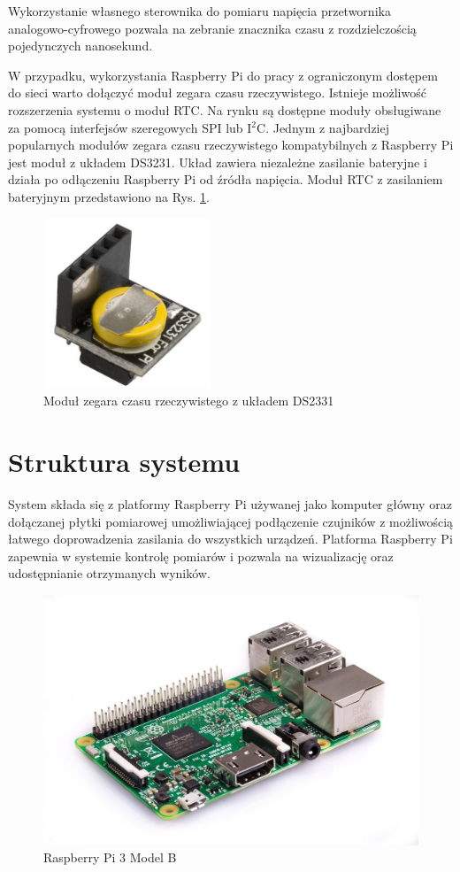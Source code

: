 Wykorzystanie własnego sterownika do pomiaru napięcia przetwornika analogowo-cyfrowego pozwala na zebranie znacznika czasu z rozdzielczością pojedynczych nanosekund. 

W przypadku, wykorzystania Raspberry Pi do pracy z ograniczonym dostępem do sieci warto dołączyć moduł zegara czasu rzeczywistego.
Istnieje możliwość rozszerzenia systemu o moduł RTC. Na rynku są dostępne moduły obsługiwane za pomocą interfejsów szeregowych SPI lub I$^2$C. Jednym z najbardziej popularnych modułów zegara czasu rzeczywistego kompatybilnych z Raspberry Pi jest moduł z układem DS3231\cite{rtc}. Układ zawiera niezależne zasilanie bateryjne i działa po odłączeniu Raspberry Pi od źródła napięcia.
Moduł RTC z zasilaniem bateryjnym przedstawiono na Rys. \ref{pic:rtc}. 

\begin{figure}[h]
	\centering
		\includegraphics[width=5cm]{rtc}
	\caption{Moduł zegara czasu rzeczywistego z układem DS2331} 
	\label{pic:rtc}
\end{figure}

\section{Struktura systemu}

System składa się z platformy Raspberry Pi używanej jako komputer główny oraz dołączanej płytki pomiarowej umożliwiającej podłączenie czujników z możliwością łatwego doprowadzenia zasilania do wszystkich urządzeń. Platforma Raspberry Pi zapewnia w systemie kontrolę pomiarów i pozwala na wizualizację oraz udostępnianie otrzymanych wyników. 


\begin{figure}[h]
	\centering
		\includegraphics[width=14cm]{rpi}
	\caption{Raspberry Pi 3 Model B} 
	\label{pic:RPi}
\end{figure}

